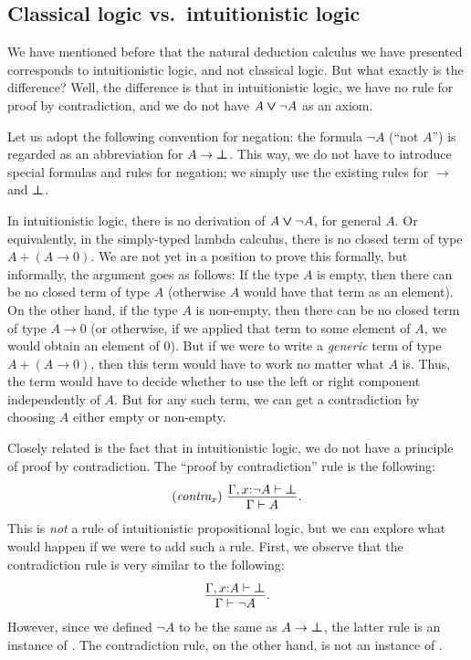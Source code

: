 \documentclass{article}
\begin{document}
\subsection{Classical logic vs.\ intuitionistic logic}

We have mentioned before that the natural deduction calculus we have
presented corresponds to intuitionistic logic, and not classical
logic. But what exactly is the difference? Well, the difference is
that in intuitionistic logic, we have no rule for proof by
contradiction, and we do not have $A\mathbin{\textrm{\rm\boldmath $\vee$}}\neg A$ as an axiom. 

Let us adopt the following convention for negation: the formula $\neg
A$ (``not $A$'') is regarded as an abbreviation for $A\to\textrm{\rm\boldmath $\bot$}$.
This way, we do not have to introduce special formulas and rules for
negation; we simply use the existing rules for $\to$ and $\textrm{\rm\boldmath $\bot$}$.

In intuitionistic logic, there is no derivation of $A\mathbin{\textrm{\rm\boldmath $\vee$}}\neg A$, for
general $A$. Or equivalently, in the simply-typed lambda calculus,
there is no closed term of type $A+(A\to 0)$. We are not yet in a
position to prove this formally, but informally, the argument goes as
follows: If the type $A$ is empty, then there can be no closed term of
type $A$ (otherwise $A$ would have that term as an element). On the
other hand, if the type $A$ is non-empty, then there can be no closed
term of type $A\to 0$ (or otherwise, if we applied that term to some
element of $A$, we would obtain an element of $0$). But if we were to
write a {\em generic} term of type $A+(A\to 0)$, then this term would
have to work no matter what $A$ is. Thus, the term would have to
decide whether to use the left or right component independently of
$A$. But for any such term, we can get a contradiction by choosing $A$
either empty or non-empty.

Closely related is the fact that in intuitionistic logic, we do not
have a principle of proof by contradiction. The ``proof by
contradiction'' rule is the following:
\[ \trule{contra$_x$}\ \deriv{\Gamma,\typ{x}{\neg A}\tj\cfalse}{\Gamma\tj A}.
\]
This is {\em not} a rule of intuitionistic
propositional logic, but we can explore what would happen if we were
to add such a rule. First, we observe that the contradiction rule is
very similar to the following:
\[ \deriv{\Gamma,\typ{x}{A}\tj\cfalse}{\Gamma\tj\neg A}.
\]
However, since we defined $\neg A$ to be the same as $A\to\textrm{\rm\boldmath $\bot$}$,
the latter rule is an instance of . The contradiction
rule, on the other hand, is not an instance of .
\end{document}
